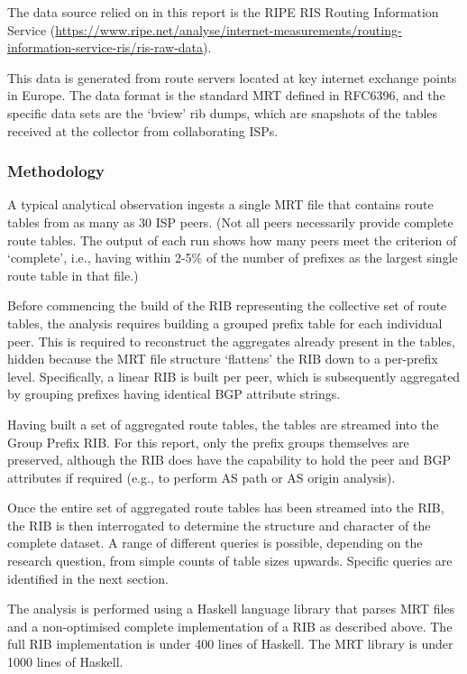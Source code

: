 The data source relied on in this report is the RIPE RIS Routing Information Service (\url{https://www.ripe.net/analyse/internet-measurements/routing-information-service-ris/ris-raw-data}).

This data is generated from route servers located at key internet exchange points in Europe. The data format is the standard MRT defined in RFC6396, and the specific data sets are the `bview' rib dumps, which are snapshots of the tables received at the collector from collaborating ISPs.

\subsubsection{Methodology}

A typical analytical observation ingests a single MRT file that contains route tables from as many as 30 ISP peers. (Not all peers necessarily provide complete route tables. The output of each run shows how many peers meet the criterion of `complete', i.e., having within 2-5\% of the number of prefixes as the largest single route table in that file.)

Before commencing the build of the RIB representing the collective set of route tables, the analysis requires building a grouped prefix table for each individual peer. This is required to reconstruct the
aggregates already present in the tables, hidden because the MRT file structure `flattens' the RIB down to a per-prefix level. Specifically, a linear RIB is built per peer, which is subsequently aggregated by grouping prefixes having identical BGP attribute strings.

Having built a set of aggregated route tables, the tables are streamed into the Group Prefix RIB. For this report, only the prefix groups themselves are preserved, although the RIB does have the capability to hold the peer and BGP attributes if required (e.g., to perform AS path or AS origin analysis).

Once the entire set of aggregated route tables has been streamed into the RIB, the RIB is then interrogated to determine the structure and character of the complete dataset. A range of different queries is possible, depending on the research question, from simple counts of table sizes upwards. Specific queries are identified in the next section.

The analysis is performed using a Haskell language library that parses MRT files and a non-optimised complete implementation of a RIB as described above. The full RIB implementation is under 400 lines of Haskell. The MRT library is under 1000 lines of Haskell.

